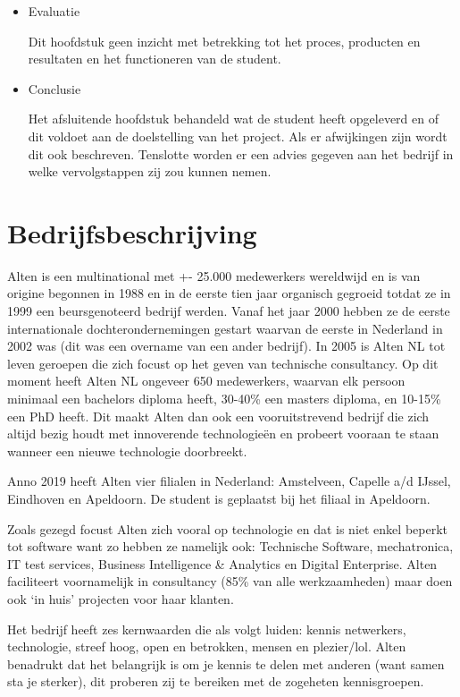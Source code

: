 \documentclass[a4paper, 11pt, oneside]{report}
\begin{document}
\begin{itemize}
	\item Evaluatie 
	
	Dit hoofdstuk geen inzicht met betrekking tot het proces, producten en resultaten en het functioneren van de student.
	
	\item Conclusie
	
	Het afsluitende hoofdstuk behandeld wat de student heeft opgeleverd en of dit voldoet aan de doelstelling van het project.
	Als er afwijkingen zijn wordt dit ook beschreven.
	Tenslotte worden er een advies gegeven aan het bedrijf in welke vervolgstappen zij zou kunnen nemen.
	
\end{itemize}

\chapter{Bedrijfsbeschrijving}\label{sec:bedrijfsbeschrijving}

Alten is een multinational met +- 25.000 medewerkers wereldwijd en is van origine begonnen in 1988 en in de eerste tien jaar organisch gegroeid totdat ze in 1999 een beursgenoteerd bedrijf werden.
Vanaf het jaar 2000 hebben ze de eerste internationale dochterondernemingen gestart waarvan de eerste in Nederland in 2002 was (dit was een overname van een ander bedrijf).
In 2005 is Alten NL tot leven geroepen die zich focust op het geven van technische consultancy.
Op dit moment heeft Alten NL ongeveer 650 medewerkers, waarvan elk persoon minimaal een bachelors diploma heeft, 30-40\% een masters diploma, en 10-15\% een PhD heeft.
Dit maakt Alten dan ook een vooruitstrevend bedrijf die zich altijd bezig houdt met innoverende technologieën en probeert vooraan te staan
wanneer een nieuwe technologie doorbreekt.

Anno 2019 heeft Alten vier filialen in Nederland: Amstelveen, Capelle a/d IJssel, Eindhoven en Apeldoorn.
De student is geplaatst bij het filiaal in Apeldoorn.

Zoals gezegd focust Alten zich vooral op technologie en dat is niet enkel beperkt tot software want zo hebben ze namelijk ook: Technische Software, mechatronica, IT test services, Business Intelligence \& Analytics en Digital Enterprise.
Alten faciliteert voornamelijk in consultancy (85\% van alle werkzaamheden) maar doen ook ‘in huis’ projecten voor haar klanten.

Het bedrijf heeft zes kernwaarden die als volgt luiden: kennis netwerkers, technologie, streef hoog, open en betrokken, mensen en plezier/lol.
Alten benadrukt dat het belangrijk is om je kennis te delen met anderen (want samen sta je sterker), dit proberen zij
te bereiken met de zogeheten kennisgroepen. 
\end{document}
